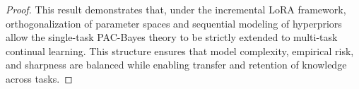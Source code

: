 \documentclass[letterpaper]{article} %
\begin{document}
\begin{proof}

 This result demonstrates that, under the incremental LoRA framework, orthogonalization of parameter spaces and sequential modeling of hyperpriors allow the single-task PAC-Bayes theory to be strictly extended to multi-task continual learning. This structure ensures that model complexity, empirical risk, and sharpness are balanced while enabling transfer and retention of knowledge across tasks.




\end{proof}
\end{document}
